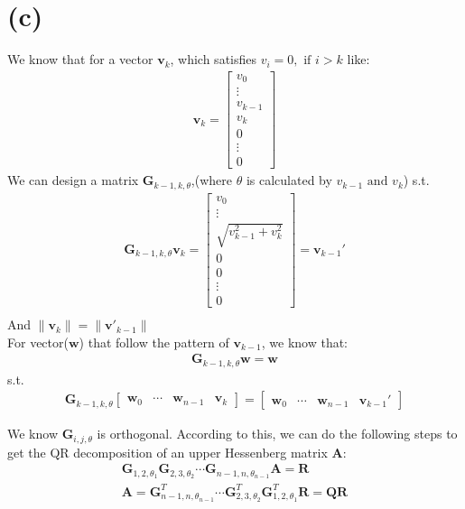 \documentclass{article}
\begin{document}
\section*{(c)}
We know that for a vector \(\bm{v}_k\), which satisfies \(v_{i} = 0, \text{ if } i > k\) like:
\begin{align*}
    \bm{v}_k = \begin{bmatrix}
        v_0 \\
        \vdots \\
        v_{k - 1}\\
        v_k \\
        0 \\
        \vdots \\
        0 
    \end{bmatrix}
\end{align*}
We can design a matrix \(\bm{G}_{k - 1, k, \theta}\),(where \(\theta\) is calculated by \(v_{k-1} \text{ and } v_k\)) s.t.
\begin{align*}
    \bm{G}_{k - 1, k, \theta} \bm{v}_k = \begin{bmatrix}
        v_0 \\
        \vdots \\
        \sqrt{v_{k - 1}^2 + v_{k}^2}\\
        0 \\
        0 \\
        \vdots \\
        0 
    \end{bmatrix} = \bm{v}_{k-1}' \\
\end{align*}
And \(\|\bm{v}_k\| = \|\bm{v}'_{k - 1}\|\)\\
For vector(\(\bm{w}\)) that follow the pattern of \(\bm{v}_{k - 1}\), we know that:
\begin{align*}
    \bm{G}_{k - 1, k, \theta} \bm{w} = \bm{w}
\end{align*}
s.t.
\begin{align*}
    \bm{G}_{k - 1, k, \theta} \begin{bmatrix}
        \bm{w}_0 & \cdots &\bm{w}_{n - 1} & \bm{v}_{k}
    \end{bmatrix} = \begin{bmatrix}
        \bm{w}_0 & \cdots &\bm{w}_{n - 1} & \bm{v}_{k - 1}'
    \end{bmatrix} 
\end{align*}


We know \(\bm{G}_{i, j, \theta}\) is orthogonal.
According to this, we can do the following steps to get the QR decomposition of an upper Hessenberg matrix \(\bm{A}\):
\begin{align*}
    \bm{G}_{1, 2, \theta_1} \bm{G}_{2, 3, \theta_2} \cdots \bm{G}_{n - 1, n, \theta_{n - 1}}\bm{A}  =  \bm{R} \\
    \bm{A} = \bm{G}_{n - 1, n, \theta_{n - 1}}^T \cdots \bm{G}_{2, 3, \theta_2}^T \bm{G}_{1, 2, \theta_1}^T\bm{R} = \bm{Q}\bm{R}
\end{align*}
\end{document}
